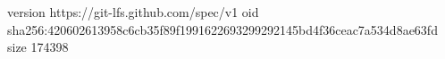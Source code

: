 version https://git-lfs.github.com/spec/v1
oid sha256:420602613958c6cb35f89f1991622693299292145bd4f36ceac7a534d8ae63fd
size 174398
